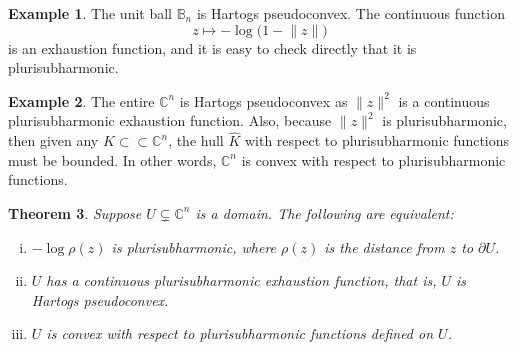 \documentclass[12pt,openany]{book}
\newcommand{\snorm}[1]{\lVert {#1} \rVert}
\newcommand{\C}{{\mathbb{C}}}
\newcommand{\bB}{{\mathbb{B}}}
\theoremstyle{plain}
\newtheorem{thm}{Theorem}[section]
\theoremstyle{remark}
\theoremstyle{definition}
\theoremstyle{exercise}
\theoremstyle{example}
\newtheorem{example}[thm]{Example}
\begin{document}
\begin{example}
The unit ball $\bB_n$ is Hartogs pseudoconvex.  The continuous
function
\begin{equation*}
z \mapsto - \log \bigl( 1-\snorm{z} \bigr) 
\end{equation*}
is an exhaustion function, and it is easy to
check directly that it is plurisubharmonic.
\end{example}

\begin{example}
The entire $\C^n$ is Hartogs pseudoconvex as $\snorm{z}^2$ is
a continuous plurisubharmonic exhaustion function.
Also, because $\snorm{z}^2$ is plurisubharmonic, then given any $K \subset \subset
\C^n$, the hull $\widehat{K}$ with respect to plurisubharmonic functions must 
be bounded.  In other words, $\C^n$ is convex with respect to
plurisubharmonic functions.
\end{example}

\begin{samepage}
\begin{thm}
Suppose $U \subsetneq \C^n$ is a domain.  The following are equivalent:
\begin{enumerate}[(i)]
\item \label{thm:pscvx:itemi}
$-\log \rho(z)$ is plurisubharmonic, where $\rho(z)$ is the distance from $z$
to $\partial U$.
\item \label{thm:pscvx:itemii}
$U$ has a continuous plurisubharmonic exhaustion function,
that is, $U$ is Hartogs pseudoconvex.
\item \label{thm:pscvx:itemiii}
$U$ is convex with respect to plurisubharmonic functions defined on $U$.
\end{enumerate}
\end{thm}
\end{samepage}
\end{document}
